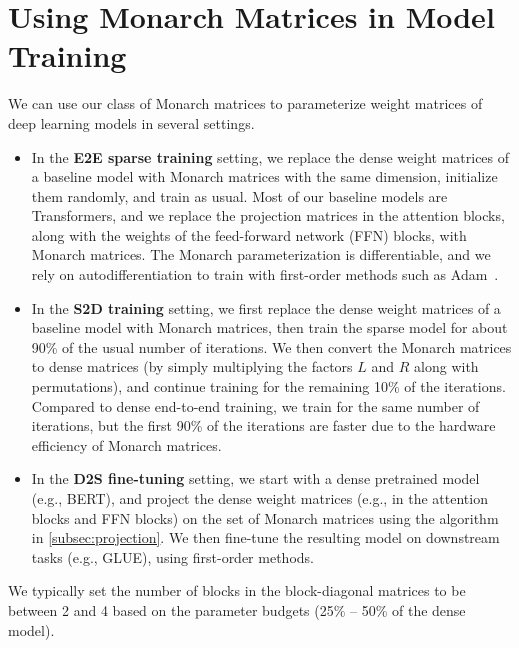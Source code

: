 \section{Using Monarch Matrices in Model Training}
\label{sec:method}

We can use our class of Monarch matrices to parameterize weight
matrices of deep learning models in several settings.

\begin{itemize}[leftmargin=*,nosep,nolistsep]
  \item In the \textbf{E2E sparse training} setting, we replace the dense weight
  matrices of a baseline model with Monarch matrices with the same dimension,
  initialize them randomly, and train as usual.
  Most of our baseline models are Transformers, and we replace the projection
  matrices in the attention blocks, along with the weights of the feed-forward
  network (FFN) blocks, with Monarch matrices.
  The Monarch parameterization is differentiable, and we rely on
  autodifferentiation to train with first-order methods such as Adam~\citep{kingma2014adam}.

  \item In the \textbf{S2D training} setting, we first replace the dense weight
  matrices of a baseline model with Monarch matrices, then train the sparse
  model for about 90\% of the usual number of iterations.
  We then convert the Monarch matrices to dense matrices (by simply multiplying
  the factors $L$ and $R$ along with permutations), and continue training for
  the remaining 10\% of the iterations.
  Compared to dense end-to-end training, we train for the same number of
  iterations, but the first 90\% of the iterations are faster due to the
  hardware efficiency of Monarch matrices.

  \item In the \textbf{D2S fine-tuning} setting, we start with a dense
  pretrained model (e.g., BERT), and project the dense weight matrices (e.g., in
  the attention blocks and FFN blocks) on the set of Monarch matrices using the
  algorithm in \cref{subsec:projection}.
  We then fine-tune the resulting model on downstream tasks (e.g., GLUE), using
  first-order methods.
\end{itemize}
We typically set the number of blocks in the block-diagonal matrices to be between 2 and 4 based on the parameter budgets (25\% -- 50\% of the dense model).

